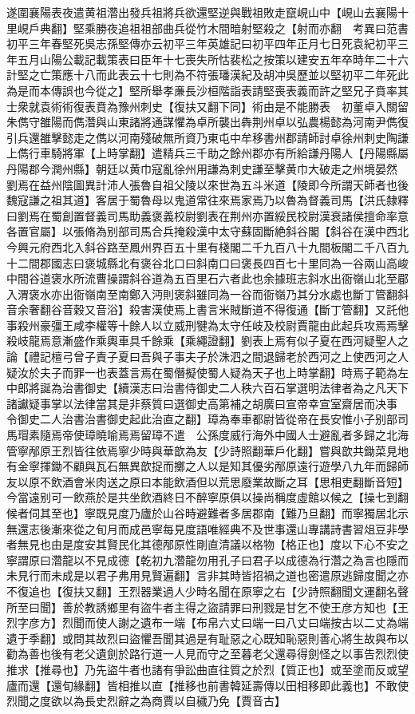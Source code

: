 遂圍襄陽表夜遣黄祖濳出發兵祖將兵欲還堅逆與戰祖敗走竄峴山中【峴山去襄陽十里峴戶典翻】堅乘勝夜追祖祖部曲兵從竹木間暗射堅殺之【射而亦翻　考異曰范書初平三年春堅死吳志孫堅傳亦云初平三年英雄記曰初平四年正月七日死袁紀初平三年五月山陽公載記載策表曰臣年十七喪失所怙裴松之按策以建安五年卒時年二十六計堅之亡策應十八而此表云十七則為不符張璠漢紀及胡冲吳歷並以堅初平二年死此為是而本傳誤也今從之】堅所舉孝亷長沙桓階詣表請堅喪表義而許之堅兄子賁率其士衆就袁術術復表賁為豫州刺史【復扶又翻下同】術由是不能勝表　初董卓入關留朱儁守雒陽而儁濳與山東諸將通謀懼為卓所襲出犇荆州卓以弘農楊懿為河南尹儁復引兵還雒擊懿走之儁以河南殘破無所資乃東屯中牟移書州郡請師討卓徐州刺史陶謙上儁行車騎將軍【上時掌翻】遣精兵三千助之餘州郡亦有所給謙丹陽人【丹陽縣屬丹陽郡今潤州縣】朝廷以黄巾寇亂徐州用謙為刺史謙至擊黄巾大破走之州境晏然　劉焉在益州陰圖異計沛人張魯自祖父陵以來世為五斗米道【陵即今所謂天師者也後魏寇謙之祖其道】客居于蜀魯母以鬼道常往來焉家焉乃以魯為督義司馬【洪氏隸釋曰劉焉在蜀創置督義司馬助義褒義校尉劉表在荆州亦置綏民校尉漢衰諸侯擅命率意各置官屬】以張脩為别部司馬合兵掩殺漢中太守蘇固斷絶斜谷閣【斜谷在漢中西北今興元府西北入斜谷路至鳳州界百五十里有棧閣二千九百八十九間板閣二千八百九十二間郡國志曰褒城縣北有褒谷北口曰斜南口曰褒長四百七十里同為一谷兩山高峻中間谷道褒水所流曹操謂斜谷道為五百里石六者此也余據班志斜水出衙嶺山北至郿入渭褒水亦出衙嶺南至南鄭入沔則褒斜雖同為一谷而衙嶺乃其分水處也斷丁管翻斜音余奢翻谷音穀又音浴】殺害漢使焉上書言米賊斷道不得復通【斷丁管翻】又託他事殺州豪彊王咸李權等十餘人以立威刑犍為太守任岐及校尉賈龍由此起兵攻焉焉擊殺岐龍焉意漸盛作乘輿車具千餘乘【乘繩證翻】劉表上焉有似子夏在西河疑聖人之論【禮記檀弓曾子責子夏曰吾與子事夫子於洙泗之間退歸老於西河之上使西河之人疑汝於夫子而罪一也表蓋言焉在蜀僭擬使蜀人疑為天子也上時掌翻】時焉子範為左中郎將誕為治書御史【續漢志曰治書侍御史二人秩六百石掌選明法律者為之凡天下諸讞疑事掌以法律當其是非蔡質曰選御史高第補之胡廣曰宣帝幸宣室齋居而决事　令御史二人治書治書御史起此治直之翻】璋為奉車都尉皆從帝在長安惟小子别部司馬瑁素隨焉帝使璋曉喻焉焉留璋不遣　公孫度威行海外中國人士避亂者多歸之北海管寧邴原王烈皆往依焉寧少時與華歆為友【少詩照翻華戶化翻】嘗與歆共鋤菜見地有金寧揮鋤不顧與瓦石無異歆捉而擲之人以是知其優劣邴原遠行遊學八九年而歸師友以原不飲酒會米肉送之原曰本能飲酒但以荒思廢業故斷之耳【思相吏翻斷音短】今當遠别可一飲燕於是共坐飲酒終日不醉寧原俱以操尚稱度虛館以候之【操七到翻候者伺其至也】寧既見度乃廬於山谷時避難者多居郡南【難乃旦翻】而寧獨居北示無還志後漸來從之旬月而成邑寧每見度語唯經典不及世事還山專講詩書習俎豆非學者無見也由是度安其賢民化其德邴原性剛直清議以格物【格正也】度以下心不安之寧謂原曰濳龍以不見成德【乾初九濳龍勿用孔子曰君子以成德為行濳之為言也隱而未見行而未成是以君子弗用見賢遍翻】言非其時皆招禍之道也密遣原逃歸度聞之亦不復追也【復扶又翻】王烈器業過人少時名聞在原寧之右【少詩照翻聞文運翻名聲所至曰聞】善於教誘鄉里有盜牛者主得之盜請罪曰刑戮是甘乞不使王彦方知也【王烈字彦方】烈聞而使人謝之遺布一端【布帛六丈曰端一曰八丈曰端按古以二丈為端遺于季翻】或問其故烈曰盜懼吾聞其過是有耻惡之心既知恥惡則善心將生故與布以勸為善也後有老父遺劍於路行道一人見而守之至暮老父還尋得劍怪之以事告烈烈使推求【推尋也】乃先盜牛者也諸有爭訟曲直往質之於烈【質正也】或至塗而反或望廬而還【還旬緣翻】皆相推以直【推移也前書韓延壽傳以田相移即此義也】不敢使烈聞之度欲以為長史烈辭之為商賈以自穢乃免【賈音古】

